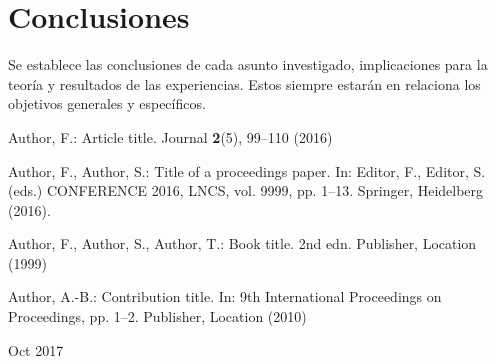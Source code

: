 \documentclass[12pt]{report}
\begin{document}
\chapter{Conclusiones}
Se establece las conclusiones de cada asunto investigado, implicaciones para la teoría y resultados de las
experiencias. Estos siempre estarán en relaciona los objetivos generales y específicos.

% 
% 

\begin{thebibliography}{8}
Author, F.: Article title. Journal \textbf{2}(5), 99--110 (2016)

Author, F., Author, S.: Title of a proceedings paper. In: Editor,
F., Editor, S. (eds.) CONFERENCE 2016, LNCS, vol. 9999, pp. 1--13.
Springer, Heidelberg (2016).

Author, F., Author, S., Author, T.: Book title. 2nd edn. Publisher,
Location (1999)

Author, A.-B.: Contribution title. In: 9th International Proceedings
on Proceedings, pp. 1--2. Publisher, Location (2010)

Oct 2017
\end{thebibliography}
\end{document}
